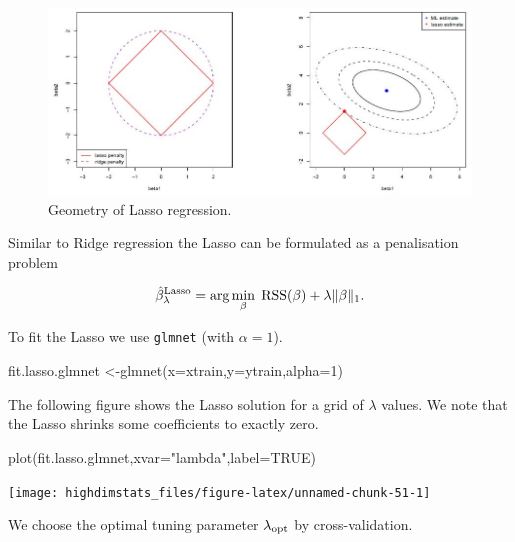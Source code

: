 \documentclass[
]{book}
\newenvironment{Shaded}{\begin{snugshade}}{\end{snugshade}}
\newcommand{\AttributeTok}[1]{\textcolor[rgb]{0.77,0.63,0.00}{#1}}
\newcommand{\ConstantTok}[1]{\textcolor[rgb]{0.00,0.00,0.00}{#1}}
\newcommand{\DecValTok}[1]{\textcolor[rgb]{0.00,0.00,0.81}{#1}}
\newcommand{\FunctionTok}[1]{\textcolor[rgb]{0.00,0.00,0.00}{#1}}
\newcommand{\NormalTok}[1]{#1}
\newcommand{\OtherTok}[1]{\textcolor[rgb]{0.56,0.35,0.01}{#1}}
\newcommand{\StringTok}[1]{\textcolor[rgb]{0.31,0.60,0.02}{#1}}
\begin{document}
\begin{figure}

{\centering \includegraphics[width=0.8\linewidth]{lasso_geometry} 

}

\caption{Geometry of Lasso regression.}\label{fig:lassogeom}
\end{figure}

Similar to Ridge regression the Lasso can be formulated as a penalisation problem

\[
\hat{\beta}^{\rm Lasso}_{\lambda}=\text{arg}\min\limits_{\beta}\;\textrm{RSS}(\beta)+\lambda\|\beta\|_1.
\]

To fit the Lasso we use \texttt{glmnet} (with \(\alpha=1\)).

\begin{Shaded}
\begin{Highlighting}[]
\NormalTok{fit.lasso.glmnet }\OtherTok{\textless{}{-}}\FunctionTok{glmnet}\NormalTok{(}\AttributeTok{x=}\NormalTok{xtrain,}\AttributeTok{y=}\NormalTok{ytrain,}\AttributeTok{alpha=}\DecValTok{1}\NormalTok{) }
\end{Highlighting}
\end{Shaded}

The following figure shows the Lasso solution for a grid of \(\lambda\) values. We note that the Lasso shrinks some coefficients to exactly zero.

\begin{Shaded}
\begin{Highlighting}[]
\FunctionTok{plot}\NormalTok{(fit.lasso.glmnet,}\AttributeTok{xvar=}\StringTok{"lambda"}\NormalTok{,}\AttributeTok{label=}\ConstantTok{TRUE}\NormalTok{)}
\end{Highlighting}
\end{Shaded}

\begin{center}\texttt{[image: highdimstats\_files/figure-latex/unnamed-chunk-51-1]} \end{center}

We choose the optimal tuning parameter \(\lambda_{\rm opt}\) by cross-validation.
\end{document}
